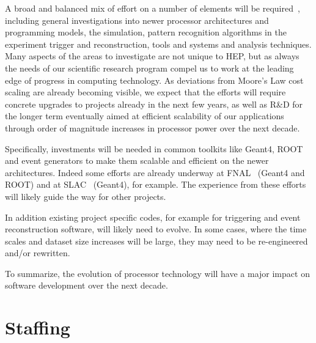 A broad and balanced mix of
effort on a number of elements will be required~\cite{ARCHWP}, including
general
investigations into newer processor architectures and programming
models, the simulation, pattern recognition algorithms in the
experiment trigger and reconstruction, tools and systems and
analysis techniques. Many aspects of the areas to investigate are
not unique to HEP, but as always the needs of our
scientific research program compel us to work at the leading edge of
progress in computing technology. As deviations from Moore's Law
cost scaling are already becoming visible, we expect that the
efforts will require concrete upgrades to projects already in the
next few years, as well as R\&D for the longer term eventually aimed at
efficient scalability of our applications through order of magnitude
increases in processor power over the next decade.

Specifically, investments will be needed in common toolkits like Geant4,
ROOT and event generators to make them scalable and efficient on the 
newer architectures. Indeed some efforts are already underway at 
FNAL~\cite{FNALWP} (Geant4 and ROOT) and at SLAC~\cite{SLACWP} (Geant4), 
for example. The experience from these efforts will likely guide the way 
for other projects. 

In addition existing project specific codes, for example for triggering
and event reconstruction software, will likely need to evolve. In
some cases, where the time scales and dataset size increases will be
large, they may need to be re-engineered and/or rewritten.

To summarize, the evolution of processor technology will have a major
impact on software development over the next decade. 

\section{Staffing}
\label{CpFI4:sec:staffing}

